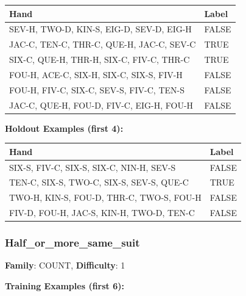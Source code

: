\documentclass[10pt,a4paper]{article}
\begin{document}
\begin{small}
\begin{tabular}{p{8cm}l}
\toprule
Hand & Label \\
\midrule
SEV-H, TWO-D, KIN-S, EIG-D, SEV-D, EIG-H & \textcolor{negative}{FALSE} \\
JAC-C, TEN-C, THR-C, QUE-H, JAC-C, SEV-C & \textcolor{positive}{TRUE} \\
SIX-C, QUE-H, THR-H, SIX-C, FIV-C, THR-C & \textcolor{positive}{TRUE} \\
FOU-H, ACE-C, SIX-H, SIX-C, SIX-S, FIV-H & \textcolor{negative}{FALSE} \\
FOU-H, FIV-C, SIX-C, SEV-S, FIV-C, TEN-S & \textcolor{negative}{FALSE} \\
JAC-C, QUE-H, FOU-D, FIV-C, EIG-H, FOU-H & \textcolor{negative}{FALSE} \\
\bottomrule
\end{tabular}
\end{small}

\textbf{Holdout Examples (first 4):}

\begin{small}
\begin{tabular}{p{8cm}l}
\toprule
Hand & Label \\
\midrule
SIX-S, FIV-C, SIX-S, SIX-C, NIN-H, SEV-S & \textcolor{negative}{FALSE} \\
TEN-C, SIX-S, TWO-C, SIX-S, SEV-S, QUE-C & \textcolor{positive}{TRUE} \\
TWO-H, KIN-S, FOU-D, THR-C, TWO-S, FOU-H & \textcolor{negative}{FALSE} \\
FIV-D, FOU-H, JAC-S, KIN-H, TWO-D, TEN-C & \textcolor{negative}{FALSE} \\
\bottomrule
\end{tabular}
\end{small}

\vspace{0.5cm}

\subsubsection{Half\_or\_more\_same\_suit}

\textbf{Family}: COUNT, \textbf{Difficulty}: 1

\textbf{Training Examples (first 6):}
\end{document}
